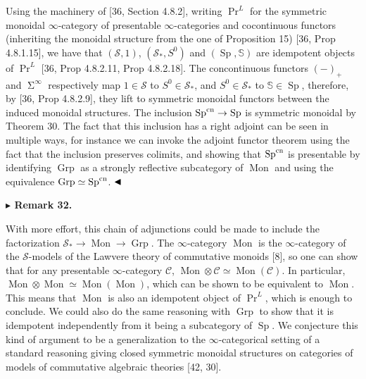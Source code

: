 Using the machinery of [36, Section 4.8.2], writing $\Pr^{L}$ for the symmetric monoidal $\infty$-category of presentable $\infty$-categories and cocontinuous functors (inheriting the monoidal structure from the one of Proposition 15) [36, Prop 4.8.1.15], we have that $({\mathcal{S}},1)$, $({\mathcal{S}}_{*},S^{0})$ and $(\operatorname{Sp},\mathbb{S})$ are idempotent objects of $\Pr^{L}$ [36, Prop 4.8.2.11, Prop 4.8.2.18]. The concontinuous functors $(-)_{+}$ and $\operatorname{\Sigma}^{\infty}$ respectively map $1\in{\mathcal{S}}$ to $S^{0}\in{\mathcal{S}}_{*}$, and $S^{0}\in{\mathcal{S}}_{*}$ to $\mathbb{S}\in\operatorname{Sp}$, therefore, by [36, Prop 4.8.2.9], they lift to symmetric monoidal functors between the induced monoidal structures. The inclusion $\operatorname{Sp}^{\textnormal{cn}}\to\operatorname{Sp}$ is symmetric monoidal by Theorem 30. The fact that this inclusion has a right adjoint can be seen in multiple ways, for instance we can invoke the adjoint functor theorem using the fact that the inclusion preserves colimits, and showing that $\operatorname{Sp}^{\textnormal{cn}}$ is presentable by identifying $\operatorname{Grp}$ as a strongly reflective subcategory of $\operatorname{Mon}$ and using the equivalence $\operatorname{Grp}\simeq\operatorname{Sp}^{\textnormal{cn}}$. $\hfill\blacktriangleleft$\par
 
 
 
\par\medskip\noindent\textbf{$\blacktriangleright$ Remark 32.}\par
 
 
With more effort, this chain of adjunctions could be made to include the factorization ${\mathcal{S}}_{*}\to\operatorname{Mon}\to\operatorname{Grp}$. The $\infty$-category $\operatorname{Mon}$ is the $\infty$-category of the ${\mathcal{S}}$-models of the Lawvere theory of commutative monoids [8], so one can show that for any presentable $\infty$-category ${\mathcal{C}}$, ${\operatorname{Mon}}\otimes{\mathcal{C}}\simeq\operatorname{Mon}({\mathcal{C}})$. In particular, $\operatorname{Mon}\otimes\operatorname{Mon}\simeq\operatorname{Mon}(\operatorname{Mon})$, which can be shown to be equivalent to $\operatorname{Mon}$. This means that $\operatorname{Mon}$ is also an idempotent object of $\Pr^{L}$, which is enough to conclude. We could also do the same reasoning with $\operatorname{Grp}$ to show that it is idempotent independently from it being a subcategory of $\operatorname{Sp}$. We conjecture this kind of argument to be a generalization to the $\infty$-categorical setting of a standard reasoning giving closed symmetric monoidal structures on categories of models of commutative algebraic theories [42, 30].\par
 
